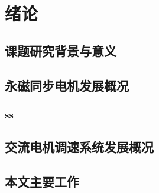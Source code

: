 \chapter{绪论}\label{ch:intr}






\section{课题研究背景与意义}

\label{sec:fastguide}
\section{永磁同步电机发展概况}
\subsection{ss}

\section{交流电机调速系统发展概况}
\section{本文主要工作}
